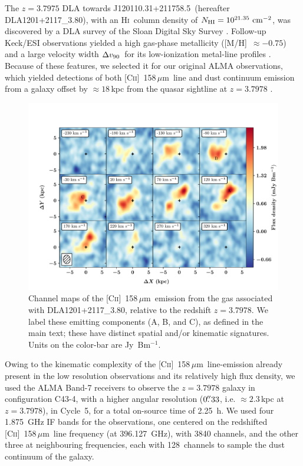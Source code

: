 \documentclass[twocolumn]{aastex62}
\newcommand{\jqso}{J120110.31+211758.5}
\newcommand{\zdla}{3.7975}
\newcommand{\dlaname}{DLA1201+2117\_3.80}
\newcommand{\cplus}{[\ctwo]~158\,$\mu$m}
\newcommand{\zcube}{3.7978}
\newcommand{\mnhi}{N_{\rm HI}}
\newcommand{\cmt}{{\rm cm}^{-2}}
\newcommand{\newcyc}{5}      %
\newcommand{\bwidth}{0\farcs33}    %
\newcommand{\spatres}{2.3}    %
\newcommand{\vrperp}{18}  %
\newcommand{\mdvninety}{\Delta v_{\rm 90}}
\newcommand{\dvninety}{$\mdvninety$}
\newcommand{\hi}{H\textsc{i}}
\newcommand{\ctwo}{C\textsc{ii}}
\begin{document}
The $z = \zdla$ DLA towards \jqso\ (hereafter \dlaname), with an \hi\ column 
density of $\mnhi = 10^{21.35}~\cmt$, was discovered by a DLA survey of the 
Sloan Digital Sky Survey \citep{phw05}. Follow-up Keck/ESI observations yielded 
a high gas-phase metallicity ([M/H]~$\approx -0.75$) and a large velocity width \dvninety\ 
for its low-ionization metal-line profiles \citep{rafelski+12}. Because of these features, we selected it for our original ALMA observations, which yielded detections of both 
\cplus\ line and dust continuum emission from a galaxy offset by $\approx \vrperp$\,kpc
from the quasar sightline at $z = 3.7978$ \citep{neeleman+17}.


\begin{figure}
\centering
\includegraphics[width=\textwidth]{fig_channel_maps.pdf}
\vspace{-0.3in}
\caption{Channel maps of the \cplus\ emission from the gas associated with 
\dlaname, relative to the redshift $z = \zcube$. We label these emitting components 
(A, B, and C), as defined in the main text; these have distinct spatial and/or 
kinematic signatures.  Units on the color-bar are Jy~Bm$^{-1}$.
}
\label{fig:channel}
\end{figure}
%

Owing to the kinematic complexity of the \cplus\ line-emission already present in the low resolution observations and its relatively 
high flux density, we used the ALMA Band-7 receivers to observe the $z = 3.7978$ 
galaxy in configuration C43-4, with a higher angular resolution ($\bwidth$, i.e. 
$\approx \spatres$\,kpc at $z=3.7978$), in Cycle~\newcyc, for a total on-source time 
of 2.25~h. We used four 1.875~GHz IF bands for the observations, one centered on the 
redshifted \cplus\ line frequency (at 396.127~GHz), with 3840 channels, and 
the other three at neighbouring frequencies, each with 128~channels to sample the dust continuum of the galaxy. 
\end{document}
